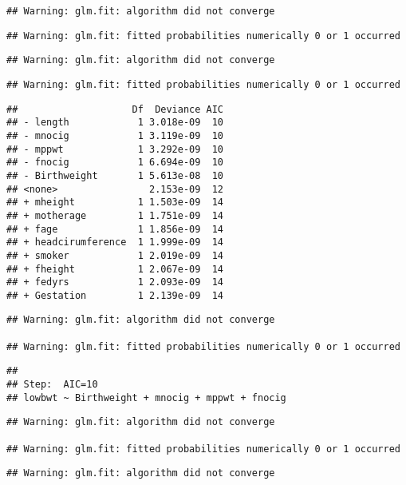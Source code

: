 \documentclass[]{article}
\begin{document}
\begin{verbatim}
## Warning: glm.fit: algorithm did not converge
\end{verbatim}

\begin{verbatim}
## Warning: glm.fit: fitted probabilities numerically 0 or 1 occurred
\end{verbatim}

\begin{verbatim}
## Warning: glm.fit: algorithm did not converge
\end{verbatim}

\begin{verbatim}
## Warning: glm.fit: fitted probabilities numerically 0 or 1 occurred
\end{verbatim}

\begin{verbatim}
##                    Df  Deviance AIC
## - length            1 3.018e-09  10
## - mnocig            1 3.119e-09  10
## - mppwt             1 3.292e-09  10
## - fnocig            1 6.694e-09  10
## - Birthweight       1 5.613e-08  10
## <none>                2.153e-09  12
## + mheight           1 1.503e-09  14
## + motherage         1 1.751e-09  14
## + fage              1 1.856e-09  14
## + headcirumference  1 1.999e-09  14
## + smoker            1 2.019e-09  14
## + fheight           1 2.067e-09  14
## + fedyrs            1 2.093e-09  14
## + Gestation         1 2.139e-09  14
\end{verbatim}

\begin{verbatim}
## Warning: glm.fit: algorithm did not converge

## Warning: glm.fit: fitted probabilities numerically 0 or 1 occurred
\end{verbatim}

\begin{verbatim}
## 
## Step:  AIC=10
## lowbwt ~ Birthweight + mnocig + mppwt + fnocig
\end{verbatim}

\begin{verbatim}
## Warning: glm.fit: algorithm did not converge

## Warning: glm.fit: fitted probabilities numerically 0 or 1 occurred
\end{verbatim}

\begin{verbatim}
## Warning: glm.fit: algorithm did not converge
\end{verbatim}
\end{document}
